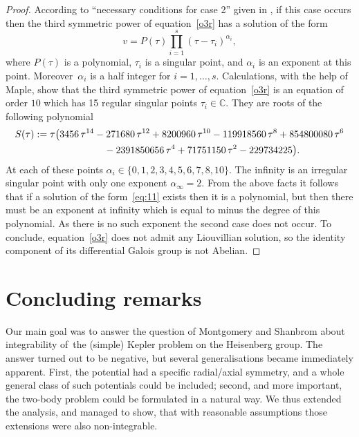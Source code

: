 \documentclass[pdftex]{sigma}
\numberwithin{equation}{section}
\begin{document}
\begin{proof}
 According to ``necessary conditions for case 2'' given in
 \cite[p.~12]{SU}, if this case occurs then the third symmetric power of
 equation~\eqref{o3r} has a solution of the form
 \begin{equation}
 \label{eq:11}
 v=P(\tau)\prod_{i=1}^{s}(\tau-\tau_i)^{\alpha_i},
 \end{equation}
 where $P(\tau)$ is a polynomial, $\tau_i$ is a singular point, and
 $\alpha_i$ is an exponent at this point. Moreover~$\alpha_i$ is a
 half integer for $i=1,\ldots, s$. Calculations, with the help of
 Maple, show that the third symmetric power of equation~\eqref{o3r} is
 an equation of order $10$ which has 15 regular singular points
 $\tau_i\in\mathbb{C}$. They are roots of the following polynomial
 \begin{gather*}
 S(\tau):=\tau\big(3456\,{\tau}^{14}-271680\,{\tau}^{12}+ 8200960\,{\tau}^{10}-119918560\, {\tau}^{8}
 +854800080\,{\tau}^{6}
 \\ \hphantom{ S(\tau):=\tau\big(}
 {}-2391850656\,{\tau}^{4}+ 71751150\,{ \tau}^{2}-229734225\big).
 \end{gather*}
 At each of these points $\alpha_i\in\{0,1,2,3,4,5,6,7,8,10\}$. The
 infinity is an irregular singular point with only one exponent
 $\alpha_{\infty}=2$. From the above facts it follows that if a
 solution of the form~\eqref{eq:11} exists then it is a polynomial,
 but then there must be an exponent at infinity which is equal to
 minus the degree of this polynomial. As there is no such exponent
 the second case does not occur. To conclude, equation~\eqref{o3r}
 does not admit any Liouvillian solution, so the identity component
 of its differential Galois group is not Abelian.
\end{proof}

\section{Concluding remarks}

Our main goal was to answer the question of Montgomery and Shanbrom about integrability of~the (simple) Kepler problem on the Heisenberg group. The answer turned out to be negative, but several generalisations became immediately apparent. First, the potential had a specific radial/axial symmetry, and a whole general class of such potentials could be included; second, and more important, the two-body problem could be formulated in a natural way. We thus extended the analysis, and managed to show, that with reasonable assumptions those extensions were also non-integrable.
\end{document}
